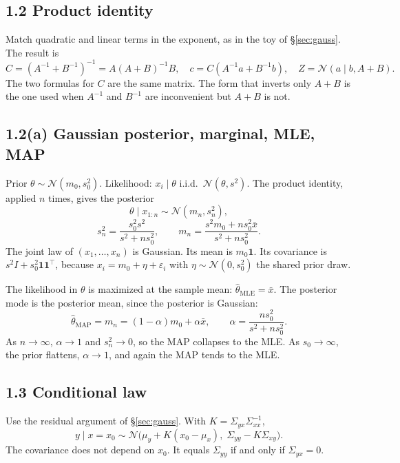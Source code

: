\documentclass[11pt]{article}
\theoremstyle{remark}
\newcommand{\N}{\mathcal{N}}
\begin{document}
\subsection*{1.2 Product identity}

Match quadratic and linear terms in the exponent, as in the toy of \S\ref{sec:gauss}. The result is
\[
\boxed{C=(A^{-1}+B^{-1})^{-1}=A(A+B)^{-1}B,\quad
c=C(A^{-1}a+B^{-1}b),\quad
Z=\N(a\mid b,A+B)}.
\]
The two formulas for \(C\) are the same matrix. The form that inverts only \(A+B\) is the one used when \(A^{-1}\) and \(B^{-1}\) are inconvenient but \(A+B\) is not.

\subsection*{1.2(a) Gaussian posterior, marginal, MLE, MAP}

Prior \(\theta\sim\N(m_0,s_0^2)\). Likelihood: \(x_i\mid\theta\) i.i.d.\ \(\N(\theta,s^2)\). The product identity, applied \(n\) times, gives the posterior
\[
\theta\mid x_{1:n}\sim\N(m_n,s_n^2),
\]
\[
s_n^2=\frac{s_0^2 s^2}{s^2+n s_0^2},\qquad
m_n=\frac{s^2 m_0+n s_0^2\bar x}{s^2+n s_0^2}.
\]
The joint law of \((x_1,\ldots,x_n)\) is Gaussian. Its mean is \(m_0\mathbf{1}\). Its covariance is \(s^2 I+s_0^2\mathbf{1}\mathbf{1}^\top\), because \(x_i=m_0+\eta+\varepsilon_i\) with \(\eta\sim\N(0,s_0^2)\) the shared prior draw.

The likelihood in \(\theta\) is maximized at the sample mean: \(\hat\theta_{\mathrm{MLE}}=\bar x\). The posterior mode is the posterior mean, since the posterior is Gaussian:
\[
\hat\theta_{\mathrm{MAP}}=m_n
=(1-\alpha)m_0+\alpha\bar x,
\qquad
\alpha=\frac{n s_0^2}{s^2+n s_0^2}.
\]
As \(n\to\infty\), \(\alpha\to 1\) and \(s_n^2\to 0\), so the MAP collapses to the MLE. As \(s_0\to\infty\), the prior flattens, \(\alpha\to 1\), and again the MAP tends to the MLE.

\subsection*{1.3 Conditional law}

Use the residual argument of \S\ref{sec:gauss}. With \(K=\Sigma_{yx}\Sigma_{xx}^{-1}\),
\[
\boxed{y\mid x=x_0\sim\N\big(\mu_y+K(x_0-\mu_x),\;
\Sigma_{yy}-K\Sigma_{xy}\big)}.
\]
The covariance does not depend on \(x_0\). It equals \(\Sigma_{yy}\) if and only if \(\Sigma_{yx}=0\).
\end{document}
